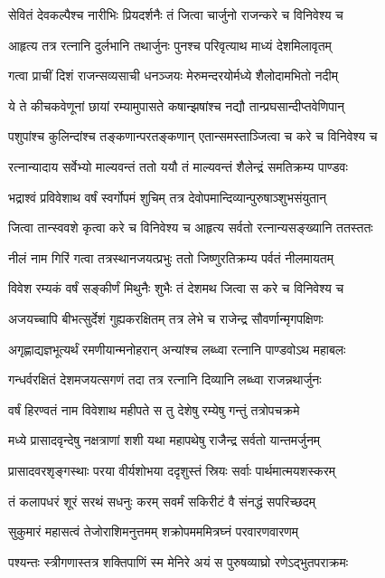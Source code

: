 \twolineshloka
{सेवितं देवकल्पैश्च नारीभिः प्रियदर्शनैः}
{तं जित्वा चार्जुनो राजन्करे च विनिवेश्य च}


\twolineshloka
{आहृत्य तत्र रत्नानि दुर्लभानि तथार्जुनः}
{पुनश्च परिवृत्याथ माध्यं देशमिलावृतम्}


\twolineshloka
{गत्वा प्राचीं दिशं राजन्सव्यसाची धनञ्जयः}
{मेरुमन्दरयोर्मध्ये शैलोदामभितो नदीम्}


\twolineshloka
{ये ते कीचकवेणूनां छायां रम्यामुपासते}
{कषान्झषांश्च नद्यौ तान्प्रघसान्दीप्तवेणिपान्}


\twolineshloka
{पशुपांश्च कुलिन्दांश्च तङ्कणान्परतङ्कणान्}
{एतान्समस्ताञ्जित्वा च करे च विनिवेश्य च}


\twolineshloka
{रत्नान्यादाय सर्वेभ्यो माल्यवन्तं ततो ययौ}
{तं माल्यवन्तं शैलेन्द्रं समतिक्रम्य पाण्डवः}


\twolineshloka
{भद्राश्वं प्रविवेशाथ वर्षं स्वर्गोपमं शुचिम्}
{तत्र देवोपमान्दिव्यान्पुरुषाञ्शुभसंयुतान्}


\twolineshloka
{जित्वा तान्स्ववशे कृत्वा करे च विनिवेश्य च}
{आहृत्य सर्वतो रत्नान्यसङ्ख्यानि ततस्ततः}


\twolineshloka
{नीलं नाम गिरिं गत्वा तत्रस्थानजयत्प्रभुः}
{ततो जिष्णुरतिक्रम्य पर्वतं नीलमायतम्}


\twolineshloka
{विवेश रम्यकं वर्षं सङ्कीर्णं मिथुनैः शुभैः}
{तं देशमथ जित्वा स करे च विनिवेश्य च}


\twolineshloka
{अजयच्चापि बीभत्सुर्देशं गुह्यकरक्षितम्}
{तत्र लेभे च राजेन्द्र सौवर्णान्मृगपक्षिणः}


\twolineshloka
{अगृह्णाद्यज्ञभूत्यर्थं रमणीयान्मनोहरान्}
{अन्यांश्च लब्ध्वा रत्नानि पाण्डवोऽथ महाबलः}


\twolineshloka
{गन्धर्वरक्षितं देशमजयत्सगणं तदा}
{तत्र रत्नानि दिव्यानि लब्ध्वा राजन्नथार्जुनः}


\twolineshloka
{वर्षं हिरण्वतं नाम विवेशाथ महीपते}
{स तु देशेषु रम्येषु गन्तुं तत्रोपचक्रमे}


\twolineshloka
{मध्ये प्रासादवृन्देषु नक्षत्राणां शशी यथा}
{महापथेषु राजैन्द्र सर्वतो यान्तमर्जुनम्}


\twolineshloka
{प्रासादवरशृङ्गस्थाः परया वीर्यशोभया}
{ददृशुस्तं स्रियः सर्वाः पार्थमात्मयशस्करम्}


\twolineshloka
{तं कलापधरं शूरं सरथं सधनुः करम्}
{सवर्मं सकिरीटं वै संनद्धं सपरिच्छदम्}


\twolineshloka
{सुकुमारं महासत्वं तेजोराशिमनुत्तमम्}
{शक्रोपमममित्रघ्नं परवारणवारणम्}


\twolineshloka
{पश्यन्तः स्त्रीगणास्तत्र शक्तिपाणिं स्म मेनिरे}
{अयं स पुरुषव्याघ्रो रणेऽद्भुतपराक्रमः}



